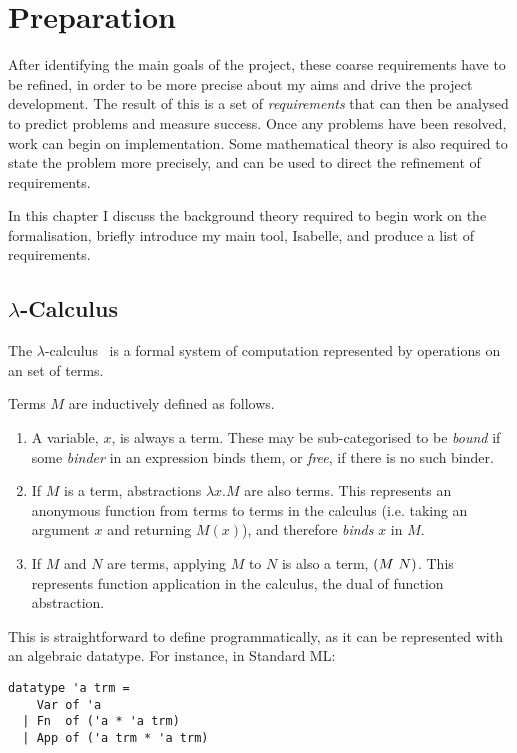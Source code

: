 \chapter{Preparation}
After identifying the main goals of the project, these coarse requirements have to be refined, in order to be more precise about my aims and drive the project development.
The result of this is a set of \emph{requirements} that can then be analysed to predict problems and measure success.
Once any problems have been resolved, work can begin on implementation.
Some mathematical theory is also required to state the problem more precisely, and can be used to direct the refinement of requirements.

In this chapter I discuss the background theory required to begin work on the formalisation, briefly introduce my main tool, Isabelle, and produce a list of requirements.

\section{\(\lambda\)-Calculus}
The \(\lambda\)-calculus~\cite{lambda-overview} is a formal system of computation represented by operations on an set of terms.
\begin{definition}
Terms \(M\) are inductively defined as follows.
\begin{enumerate}
\item
A variable, \(x\), is always a term.
These may be sub-categorised to be \emph{bound} if some \emph{binder} in an expression binds them, or \emph{free}, if there is no such binder.
\item
If \(M\) is a term, abstractions \(\lambda x.M\) are also terms.
This represents an anonymous function from terms to terms in the calculus (i.e. taking an argument \(x\) and returning \(M(x)\)), and therefore \emph{binds} \(x\) in \(M\).
\item
If \(M\) and \(N\) are terms, applying \(M\) to \(N\) is also a term, \(\left(M\ N\right)\).
This represents function application in the calculus, the dual of function abstraction.
\end{enumerate}
\end{definition}

This is straightforward to define programmatically, as it can be represented with an algebraic datatype.
For instance, in Standard ML:
\begin{verbatim}
datatype 'a trm =
    Var of 'a
  | Fn  of ('a * 'a trm)
  | App of ('a trm * 'a trm)
\end{verbatim}

